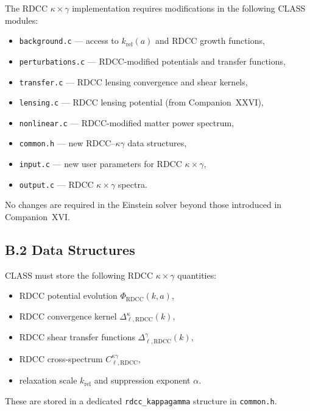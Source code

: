 \documentclass[11pt,a4paper]{article}
\begin{document}
The RDCC $\kappa \times \gamma$ implementation requires modifications in the following 
CLASS modules:

\begin{itemize}
    \item \texttt{background.c} — access to $k_{\mathrm{rel}}(a)$ and RDCC growth functions,
    \item \texttt{perturbations.c} — RDCC-modified potentials and transfer functions,
    \item \texttt{transfer.c} — RDCC lensing convergence and shear kernels,
    \item \texttt{lensing.c} — RDCC lensing potential (from Companion~XXVI),
    \item \texttt{nonlinear.c} — RDCC-modified matter power spectrum,
    \item \texttt{common.h} — new RDCC–$\kappa\gamma$ data structures,
    \item \texttt{input.c} — new user parameters for RDCC $\kappa \times \gamma$,
    \item \texttt{output.c} — RDCC $\kappa \times \gamma$ spectra.
\end{itemize}

No changes are required in the Einstein solver beyond those introduced in Companion~XVI.

\subsection*{B.2 Data Structures}

CLASS must store the following RDCC $\kappa \times \gamma$ quantities:

\begin{itemize}
    \item RDCC potential evolution $\Phi_{\mathrm{RDCC}}(k,a)$,
    \item RDCC convergence kernel $\Delta_{\ell,\mathrm{RDCC}}^{\kappa}(k)$,
    \item RDCC shear transfer functions $\Delta_{\ell,\mathrm{RDCC}}^{\gamma}(k)$,
    \item RDCC cross-spectrum $C_{\ell,\mathrm{RDCC}}^{\kappa\gamma}$,
    \item relaxation scale $k_{\mathrm{rel}}$ and suppression exponent $\alpha$.
\end{itemize}

These are stored in a dedicated \texttt{rdcc\_kappagamma} structure in \texttt{common.h}.
\end{document}
